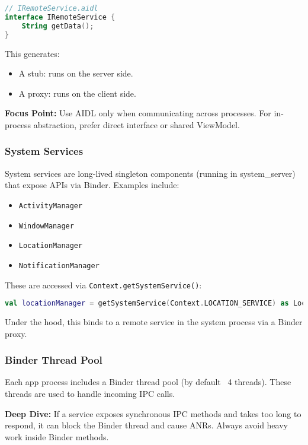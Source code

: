 \documentclass[a4paper,12pt]{article}
\begin{document}
\begin{lstlisting}[language=Kotlin]
// IRemoteService.aidl
interface IRemoteService {
    String getData();
}
\end{lstlisting}

This generates:
\begin{itemize}
  \item A stub: runs on the server side.
  \item A proxy: runs on the client side.
\end{itemize}

\textbf{Focus Point:} Use AIDL only when communicating across processes. For in-process abstraction, prefer direct interface or shared ViewModel.

\subsubsection{System Services}

System services are long-lived singleton components (running in system\_server) that expose APIs via Binder. Examples include:

\begin{itemize}
  \item \texttt{ActivityManager}
  \item \texttt{WindowManager}
  \item \texttt{LocationManager}
  \item \texttt{NotificationManager}
\end{itemize}

These are accessed via \texttt{Context.getSystemService()}:

\begin{lstlisting}[language=Kotlin]
val locationManager = getSystemService(Context.LOCATION_SERVICE) as LocationManager
\end{lstlisting}

Under the hood, this binds to a remote service in the system process via a Binder proxy.

\subsubsection{Binder Thread Pool}

Each app process includes a Binder thread pool (by default ~4 threads). These threads are used to handle incoming IPC calls.

\textbf{Deep Dive:} If a service exposes synchronous IPC methods and takes too long to respond, it can block the Binder thread and cause ANRs. Always avoid heavy work inside Binder methods.
\end{document}
